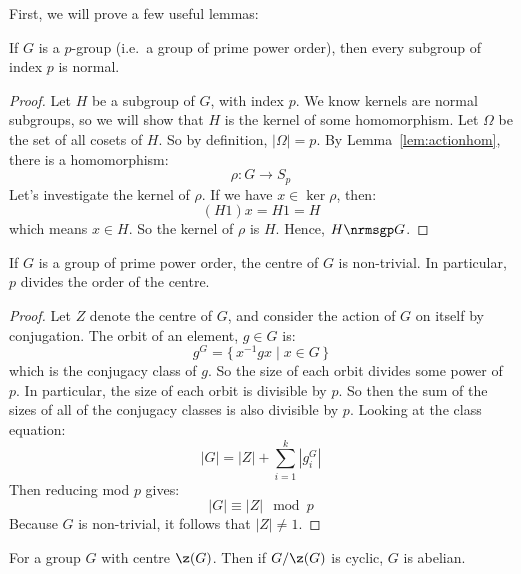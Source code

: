 First, we will prove a few useful lemmas:

\begin{lemma}\label{lem:index_p_normal}
    If \(G\) is a \(p\)-group (i.e.\ a group of prime power order), then every subgroup of index \(p\) is normal.
\end{lemma}

\begin{proof}
    Let \(H\) be a subgroup of \(G\), with index \(p\).
    We know kernels are normal subgroups, so we will show that \(H\) is the kernel of some homomorphism. %
    Let \(\Omega\) be the set of all cosets of \(H\).
    So by definition, \(|\Omega| = p\).
    By Lemma~\ref{lem:actionhom}, there is a homomorphism:
    \[\rho:G \to S_p\]
    Let's investigate the kernel of \(\rho\).
    If we have \(x \in \ker{\rho}\), then:
    \[(H1)x = H1 = H\]
    which means \(x \in H\).
    So the kernel of \(\rho\) is \(H\).
    Hence, \(H \nrmsgp G\).
\end{proof}

\begin{lemma}\label{lem:z_non_trivial}
    If \(G\) is a group of prime power order, the centre of \(G\) is non-trivial.
    In particular, \(p\) divides the order of the centre.
\end{lemma}

\begin{proof}
    Let \(Z\) denote the centre of \(G\), and consider the action of \(G\) on itself by conjugation.
    The orbit of an element, \(g \in G\) is:
    \[g^G = \{\,x^{-1}gx \mid x \in G\,\}\]
    which is the conjugacy class of \(g\).
    So the size of each orbit divides some power of \(p\).
    In particular, the size of each orbit is divisible by \(p\).
    So then the sum of the sizes of all of the conjugacy classes is also divisible by \(p\).
    Looking at the class equation:
    \[|G| = |Z| + \sum_{i=1}^k |g_i^G|\]
    Then reducing mod \(p\) gives:
    \[|G| \equiv |Z| \mod{p}\]
    Because \(G\) is non-trivial, it follows that \(|Z| \neq 1\).

\end{proof}

\begin{lemma}\label{lem:cyclic_over_centre}
    For a group \(G\) with centre \(\z(G)\).
    Then if \(G/\z(G)\) is cyclic, \(G\) is abelian.
\end{lemma}

